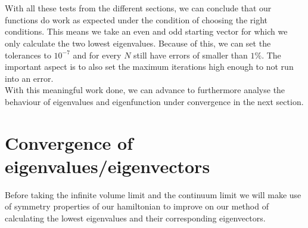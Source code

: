 \documentclass[11pt, letterpaper, onecolumn]{article}
\begin{document}
		\\
		\\
		With all these tests from the different sections, we can conclude that our functions do work as expected under the condition of choosing the right conditions. This means we take an even and odd starting vector for which we only calculate the two lowest eigenvalues. Because of this, we can set the tolerances to $10^{-7}$ and for every $N$ still have errors of smaller than $1\%$. The important aspect is to also set the maximum iterations high enough to not run into an error.\\
		With this meaningful work done, we can advance to furthermore analyse the behaviour of eigenvalues and eigenfunction under convergence in the next section.
	

 
	
	\section{Convergence of eigenvalues/eigenvectors}
	Before taking the infinite volume limit and the continuum limit we will make use of symmetry properties of our hamiltonian to improve on our method of calculating the lowest eigenvalues and their corresponding eigenvectors.
\end{document}
